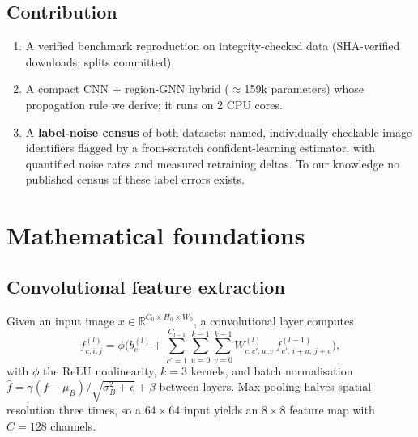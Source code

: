 \documentclass[11pt]{article}
\theoremstyle{definition}
\newcommand{\R}{\mathbb{R}}
\begin{document}
\subsection{Contribution}
\begin{enumerate}
\item A verified benchmark reproduction on integrity-checked data
(SHA-verified downloads; splits committed).
\item A compact CNN + region-GNN hybrid ($\approx$159k parameters) whose
propagation rule we derive; it runs on 2 CPU cores.
\item A \textbf{label-noise census} of both datasets: named, individually checkable
image identifiers flagged by a from-scratch confident-learning estimator,
with quantified noise rates and measured retraining deltas. To our knowledge
no published census of these label errors exists.
\end{enumerate}

\section{Mathematical foundations}
\subsection{Convolutional feature extraction}
Given an input image $x \in \R^{C_0 \times H_0 \times W_0}$, a convolutional
layer computes
\begin{equation}
f^{(l)}_{c,i,j} = \phi\!\Big(b^{(l)}_c + \sum_{c'=1}^{C_{l-1}} \sum_{u=0}^{k-1}\sum_{v=0}^{k-1} W^{(l)}_{c,c',u,v}\, f^{(l-1)}_{c',\, i+u,\, j+v}\Big),
\label{eq:conv}
\end{equation}
with $\phi$ the ReLU nonlinearity, $k=3$ kernels, and batch normalisation
$\hat f = \gamma (f-\mu_B)/\sqrt{\sigma_B^2+\epsilon}+\beta$ between layers.
Max pooling halves spatial resolution three times, so a $64\times64$ input
yields an $8\times8$ feature map with $C{=}128$ channels.
\end{document}
